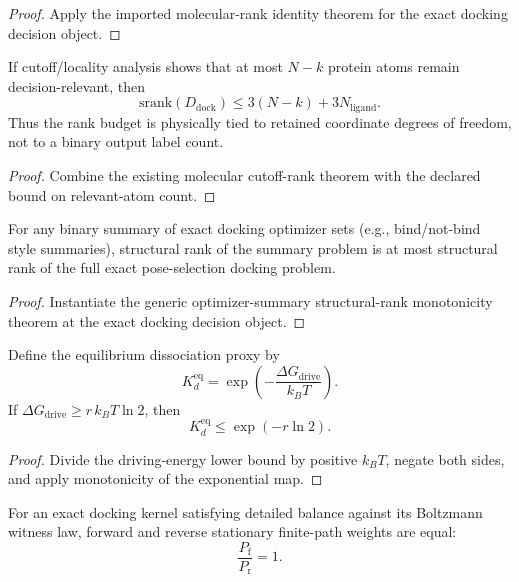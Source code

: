 \begin{proof}
Apply the imported molecular-rank identity theorem for the exact docking decision object.
\end{proof}

\begin{theorem}\label{thm:md-physical-3n-minus-k-budget}
If cutoff/locality analysis shows that at most $N-k$ protein atoms remain decision-relevant, then
\[
\mathrm{srank}(D_{\mathrm{dock}}) \le 3(N-k) + 3N_{\mathrm{ligand}}.
\]
Thus the rank budget is physically tied to retained coordinate degrees of freedom, not to a binary output label count.
\end{theorem}

\begin{proof}
Combine the existing molecular cutoff-rank theorem with the declared bound on relevant-atom count.
\end{proof}

\begin{theorem}\label{thm:md-binary-summary-rank-monotonicity}
For any binary summary of exact docking optimizer sets (e.g., bind/not-bind style summaries), structural rank of the summary problem is at most structural rank of the full exact pose-selection docking problem.
\end{theorem}

\begin{proof}
Instantiate the generic optimizer-summary structural-rank monotonicity theorem at the exact docking decision object.
\end{proof}

\begin{theorem}\label{thm:equilibrium-kd-driving-energy-floor}
Define the equilibrium dissociation proxy by
\[
K_d^{\mathrm{eq}} = \exp\!\left(-\frac{\Delta G_{\mathrm{drive}}}{k_B T}\right).
\]
If $\Delta G_{\mathrm{drive}} \ge r\,k_B T\ln 2$, then
\[
K_d^{\mathrm{eq}} \le \exp(-r\ln 2).
\]
\end{theorem}

\begin{proof}
Divide the driving-energy lower bound by positive $k_BT$, negate both sides, and apply monotonicity of the exponential map.
\end{proof}

\begin{theorem}\label{thm:md-detailed-balance-equilibrium-pathratio}
For an exact docking kernel satisfying detailed balance against its Boltzmann witness law, forward and reverse stationary finite-path weights are equal:
\[
\frac{P_{\mathrm f}}{P_{\mathrm r}} = 1.
\]
\end{theorem}

